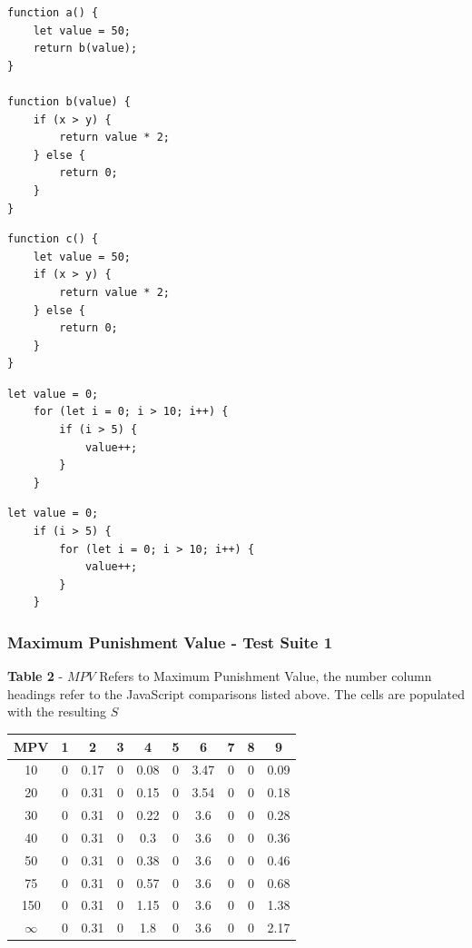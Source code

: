 \documentclass[jou,apacite]{apa6}
\begin{document}
\begin{lstlisting}[caption=Comparison 8a - Functing call vs inlining]
function a() {
	let value = 50;
	return b(value);
}

function b(value) {
	if (x > y) {
		return value * 2;
	} else {
		return 0;
	}
}
\end{lstlisting}

\begin{lstlisting}[caption=Comparison 8b]
function c() {
	let value = 50;
	if (x > y) {
		return value * 2;
	} else {
		return 0;
	}
}
\end{lstlisting}

\begin{lstlisting}[caption=Comparison 9a - Inversion of control structure]
	let value = 0;
	for (let i = 0; i > 10; i++) {
		if (i > 5) {
			value++;
		}
	}
\end{lstlisting}

\begin{lstlisting}[caption=Comparison 9b - Inversion of control structure]
	let value = 0;
	if (i > 5) {
		for (let i = 0; i > 10; i++) {
			value++;
		}
	}
\end{lstlisting}
\subsubsection{Maximum Punishment Value - Test Suite 1}

\textbf{Table 2} - $MPV$ Refers to Maximum Punishment Value, the number column headings refer to the JavaScript comparisons listed above. The cells are populated with the resulting $S$

\renewcommand{\arraystretch}{1.5}

\begin{center}
 \begin{tabular}{||c c c c c c c c c c||} 
 \hline
 MPV  & 1 & 2 & 3 & 4 & 5 & 6 & 7 & 8 & 9 \\ [0.5ex] 
 \hline\hline
 10 & 0 & 0.17 & 0 & 0.08 & 0 & 3.47 & 0 & 0 & 0.09 \\ 
 \hline
 20 & 0 & 0.31 & 0 & 0.15 & 0 & 3.54 & 0 & 0 & 0.18 \\ 
 \hline
 30 & 0 & 0.31 & 0 & 0.22 & 0 & 3.6 & 0 & 0 & 0.28 \\ 
 \hline
  40 & 0 & 0.31 & 0 & 0.3 & 0 & 3.6 & 0 & 0 & 0.36 \\ 
  \hline
    50 & 0 & 0.31 & 0 & 0.38 & 0 & 3.6 & 0 & 0 & 0.46 \\ 
  \hline
   75 & 0 & 0.31 & 0 & 0.57 & 0 & 3.6 & 0 & 0 & 0.68 \\ 
  \hline
  150 & 0 & 0.31 & 0 & 1.15 & 0 & 3.6 & 0 & 0 & 1.38 \\ 
  \hline
  $\infty$ & 0 & 0.31 & 0 & 1.8 & 0 & 3.6 & 0 & 0 & 2.17 \\ 
  \hline
  
\end{tabular}
\end{center}
\end{document}
